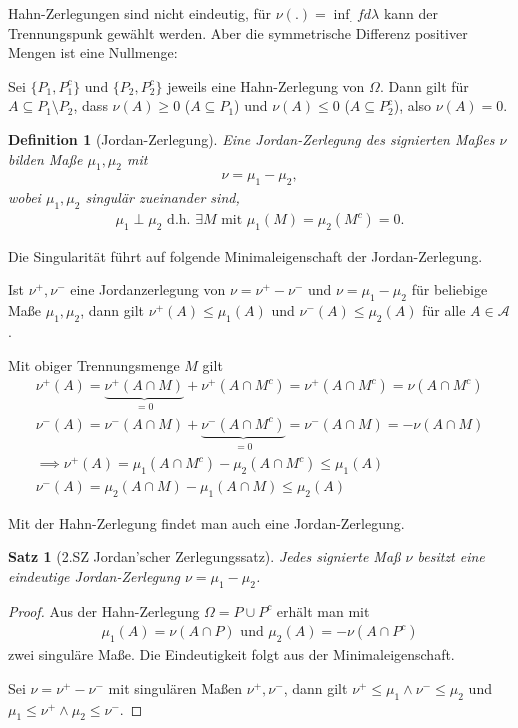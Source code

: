 \documentclass[]{article}
\newtheorem{theorem}{Satz}
\newtheorem{definition}{Definition}
\begin{document}
Hahn-Zerlegungen sind nicht eindeutig, für $\nu(.) = \inf_. f d\lambda$ kann der Trennungspunk gewählt werden. Aber die symmetrische Differenz positiver Mengen ist eine Nullmenge:

Sei $\{P_1,P_1^c\}$ und $\{P_2, P_2^c\}$ jeweils eine Hahn-Zerlegung von $\Omega$. Dann gilt für $A \subseteq P_1 \setminus P_2$, dass $\nu(A) \geq 0$ ($A \subseteq P_1$) und $\nu(A) \leq 0$ ($A \subseteq P_2^c$), also $\nu(A) = 0$.

\begin{definition}[Jordan-Zerlegung]
	Eine Jordan-Zerlegung des signierten Maßes $\nu$ bilden Maße $\mu_1, \mu_2$ mit
	\begin{align*}
		\nu = \mu_1 - \mu_2,
	\end{align*}
	wobei $\mu_1,\mu_2$ singulär zueinander sind,
	\begin{align*}
		\mu_1 \perp \mu_2 \text{ d.h. } \exists M \text{ mit } \mu_1(M) = \mu_2(M^c) = 0.
	\end{align*}
\end{definition}

Die Singularität führt auf folgende Minimaleigenschaft der Jordan-Zerlegung.

Ist $\nu^+,\nu^-$ eine Jordanzerlegung von $\nu = \nu^+ - \nu^-$ und $\nu = \mu_1 - \mu_2$ für beliebige Maße $\mu_1,\mu_2$, dann gilt $\nu^+(A) \leq \mu_1(A)$ und $\nu^-(A) \leq \mu_2(A)$ für alle $A \in \mathcal{A}$.

Mit obiger Trennungsmenge $M$ gilt
\begin{align*}
	\nu^+(A) = \underbrace{\nu^+(A\cap M)}_{=0} + \nu^+(A \cap M^c) = \nu^+(A \cap M^c) = \nu(A \cap M^c)\\
	\nu^-(A) = \nu^-(A \cap M) + \underbrace{\nu^-(A \cap M^c)}_{=0} = \nu^-(A \cap M) = - \nu(A \cap M)\\
	\implies \nu^+(A) = \mu_1(A \cap M^c) - \mu_2(A \cap M^c) \leq \mu_1(A)\\
	\nu^-(A) = \mu_2(A\cap M) - \mu_1(A \cap M) \leq \mu_2(A)
\end{align*}

Mit der Hahn-Zerlegung findet man auch eine Jordan-Zerlegung.

\begin{theorem}[2.SZ Jordan'scher Zerlegungssatz]
	Jedes signierte Maß $\nu$ besitzt eine eindeutige Jordan-Zerlegung $\nu = \mu_1 - \mu_2$.
\end{theorem}
\begin{proof}
	Aus der Hahn-Zerlegung $\Omega = P \cup P^c$ erhält man mit
	\begin{align*}
		\mu_1(A) = \nu(A \cap P) \text{ und } \mu_2(A) = - \nu(A \cap P^c)
	\end{align*}
	zwei singuläre Maße. Die Eindeutigkeit folgt aus der Minimaleigenschaft.
	
	Sei $\nu = \nu^+ - \nu^-$ mit singulären Maßen $\nu^+,\nu^-$, dann gilt $\nu^+ \leq \mu_1 \land \nu^- \leq \mu_2$ und $\mu_1 \leq \nu^+ \land \mu_2 \leq \nu^-$.
\end{proof}
\end{document}
